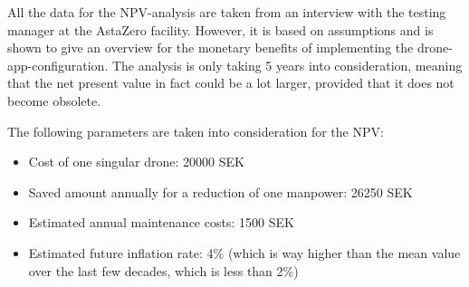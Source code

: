 All the data for the NPV-analysis are taken from an interview with the testing manager at the AstaZero facility. However, it is based on assumptions and is shown to give an overview for the monetary benefits of implementing the drone-app-configuration. The analysis is only taking 5 years into consideration, meaning that the net present value in fact could be a lot larger, provided that it does not become obsolete.

The following parameters are taken into consideration for the NPV:
\begin{itemize}
    \item Cost of one singular drone: 20000 SEK
    \item Saved amount annually for a reduction of one manpower: 26250 SEK
    \item Estimated annual maintenance costs: 1500 SEK
    \item Estimated future inflation rate: 4\% (which is way higher than the mean value over the last few decades, which is less than 2\%)
\end{itemize}
